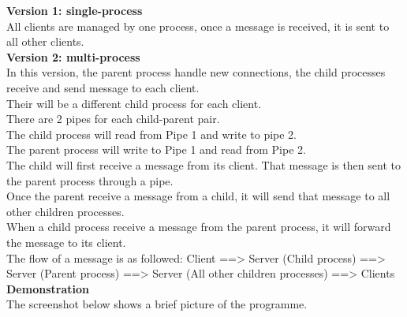\documentclass{article}
\begin{document}
\textbf{Version 1: single-process}\\
All clients are managed by one process, once a message is received, it is sent to all other clients.\\

\textbf{Version 2: multi-process}\\
In this version, the parent process handle new connections, the child processes receive and send message to each client.\\
Their will be a different child process for each client.\\
There are 2 pipes for each child-parent pair.\\
The child process will read from Pipe 1 and write to pipe 2.\\
The parent process will write to Pipe 1 and read from Pipe 2.\\

The child will first receive a message from its client. That message is then sent to the parent process through a pipe.\\
Once the parent receive a message from a child, it will send that message to all other children processes.\\
When a child process receive a message from the parent process, it will forward the message to its client.\\

The flow of a message is as followed: Client ==> Server (Child process) ==> Server (Parent process) ==> Server (All other children processes) ==> Clients\\

\textbf{Demonstration}\\
The screenshot below shows a brief picture of the programme.\\

\begin{center}
\end{center}
\end{document}
